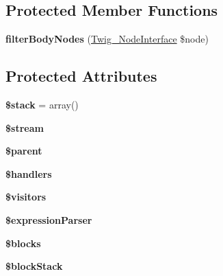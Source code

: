 \subsection*{Protected Member Functions}
\begin{DoxyCompactItemize}
\item 
{\bfseries filter\+Body\+Nodes} (\hyperlink{interfaceTwig__NodeInterface}{Twig\+\_\+\+Node\+Interface} \$node)\hypertarget{classTwig__Parser_a4998294361e0488e63ca548681d632a2}{}\label{classTwig__Parser_a4998294361e0488e63ca548681d632a2}

\end{DoxyCompactItemize}
\subsection*{Protected Attributes}
\begin{DoxyCompactItemize}
\item 
{\bfseries \$stack} = array()\hypertarget{classTwig__Parser_aee0da62aeaa3017f6ef309c28be8bb53}{}\label{classTwig__Parser_aee0da62aeaa3017f6ef309c28be8bb53}

\item 
{\bfseries \$stream}\hypertarget{classTwig__Parser_af0d6e75d8ddd4e9f78df1603db529d53}{}\label{classTwig__Parser_af0d6e75d8ddd4e9f78df1603db529d53}

\item 
{\bfseries \$parent}\hypertarget{classTwig__Parser_a264350bbc6807165e19881a2c873e1f6}{}\label{classTwig__Parser_a264350bbc6807165e19881a2c873e1f6}

\item 
{\bfseries \$handlers}\hypertarget{classTwig__Parser_af1c4caedb63a5701003e54aa9b12a82b}{}\label{classTwig__Parser_af1c4caedb63a5701003e54aa9b12a82b}

\item 
{\bfseries \$visitors}\hypertarget{classTwig__Parser_a01cf19ca0e1cbdaef6eb2df617b54e32}{}\label{classTwig__Parser_a01cf19ca0e1cbdaef6eb2df617b54e32}

\item 
{\bfseries \$expression\+Parser}\hypertarget{classTwig__Parser_a4400dc2ad9ad12567044c797d94af5a3}{}\label{classTwig__Parser_a4400dc2ad9ad12567044c797d94af5a3}

\item 
{\bfseries \$blocks}\hypertarget{classTwig__Parser_abbf9136fa494d6fa4304e881366f9a19}{}\label{classTwig__Parser_abbf9136fa494d6fa4304e881366f9a19}

\item 
{\bfseries \$block\+Stack}\hypertarget{classTwig__Parser_a9247075f9421fbfbb6e3ef1033012903}{}\label{classTwig__Parser_a9247075f9421fbfbb6e3ef1033012903}


\end{DoxyCompactItemize}
